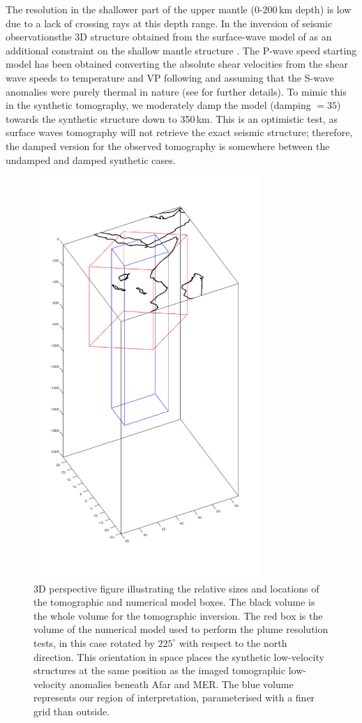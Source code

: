 \documentclass[a4paper,10pt,twocolumn]{paper}
\begin{document}
The resolution in the shallower part of the upper mantle (0-200\,km depth) is low due to a lack of crossing rays at this depth range. In the inversion of seismic observationsthe 3D structure obtained from the surface-wave model of \cite{fishwick-2010} as an additional constraint on the shallow mantle structure \citep{civiero-etal-2016,civiero-etal-2015}. The P-wave speed starting model has been obtained converting the absolute shear velocities from the shear wave speeds to temperature and VP following \cite{goes-2002} and assuming that the S-wave anomalies were purely thermal in nature (see \citealp{civiero-etal-2015} for further details). To mimic this in the synthetic tomography, we moderately damp the model (damping $= 35$) towards the synthetic structure down to 350\,km. This is an optimistic test, as surface waves tomography will not retrieve the exact seismic structure; therefore, the damped version for the observed tomography is somewhere between the undamped and damped synthetic cases.

\begin{figure}
\centering
\includegraphics[width=8.6cm]{../figures-working/fig06.png}
\caption{3D perspective figure illustrating the relative sizes and locations of the tomographic and numerical model boxes. The black volume is the whole volume for the tomographic inversion. The red box is the volume of the numerical model used to perform the plume resolution tests, in this case rotated by $225^{\circ}$ with respect to the north direction. This orientation in space places the synthetic low-velocity structures at the same position as the imaged tomographic low-velocity anomalies beneath Afar and MER. The blue volume represents our region of interpretation, parameterised with a finer grid than outside.}
\label{fg:6}
\end{figure}
\end{document}
